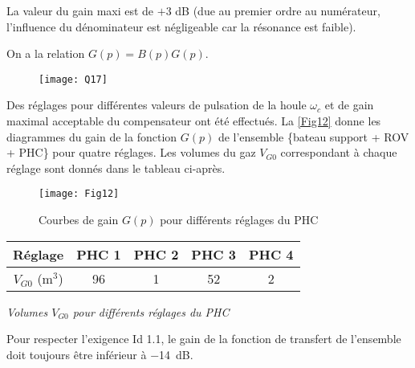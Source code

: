 \begin{multicols}{2}
\begin{corrige}
La valeur du gain maxi est de $+3$ dB (due au premier ordre au numérateur, l’influence du dénominateur est négligeable car la résonance est faible).\\

\end{corrige}
\else
\fi



\ifprof
\begin{corrige}
On a la relation $G(p)=B(p)G(p)$. 

 \begin{figure}[H]
\centering
\texttt{[image: Q17]}
\end{figure} 


\end{corrige}
\else
\fi

\ifprof
\else
Des réglages pour différentes valeurs de pulsation de la houle $\omega_c$ et de gain maximal acceptable du compensateur ont été effectués. La \autoref{Fig12} donne les diagrammes du gain de la fonction $G(p)$ de l’ensemble \{bateau support +
ROV + PHC\} pour quatre réglages. Les volumes du gaz $V_{G0}$ correspondant à chaque réglage sont donnés dans le tableau ci-après.


\begin{figure}[H]
\centering
\texttt{[image: Fig12]}
\caption{Courbes de gain $G(p)$ pour différents réglages du PHC}
\label{Fig12}
\end{figure}



\begin{center}
\begin{tabular}{|c|c|c|c|c|}
\hline
Réglage &PHC 1& PHC 2 &PHC 3 &PHC 4\\
\hline
\hline
$V_{G0}$ (m$^3$) &96& 1& 52& 2\\
\hline
\end{tabular}
\textit{Volumes $V_{G0}$ pour différents réglages du PHC}
\label{tab2}
\end{center}%



Pour respecter l’exigence Id 1.1, le gain de la fonction de transfert de l’ensemble doit toujours être inférieur à \SI{-14}{dB}.\\



\end{multicols}
